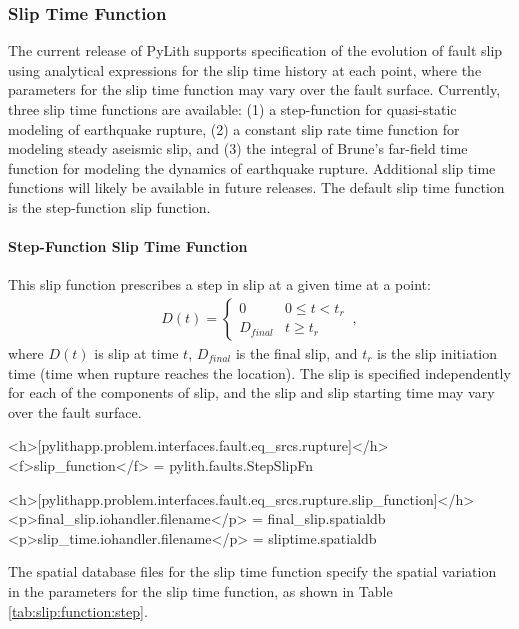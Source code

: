 \subsubsection{Slip Time Function}

The current release of PyLith supports specification of the evolution
of fault slip using analytical expressions for the slip time history
at each point, where the parameters for the slip time function may
vary over the fault surface. Currently, three slip time functions
are available: (1) a step-function for quasi-static modeling of earthquake
rupture, (2) a constant slip rate time function for modeling steady
aseismic slip, and (3) the integral of Brune's far-field time function
\cite{Brune:1970} for modeling the dynamics of earthquake rupture.
Additional slip time functions will likely be available in future
releases. The default slip time function is the step-function slip
function.


\paragraph{Step-Function Slip Time Function}

This slip function prescribes a step in slip at a given time at a
point: 
\begin{gather}
D(t)=\left\{ \begin{array}{cc}
0 & 0\leq t<t_{r}\\
D_{final} & t\ge t_{r}
\end{array}\right.\,,
\end{gather}
where $D(t)$ is slip at time $t$, $D_{final}$ is the final slip,
and $t_{r}$ is the slip initiation time (time when rupture reaches
the location). The slip is specified independently for each of the
components of slip, and the slip and slip starting time may vary over
the fault surface.
\begin{inventory}
\end{inventory}

\begin{cfg}
<h>[pylithapp.problem.interfaces.fault.eq_srcs.rupture]</h>
<f>slip_function</f> = pylith.faults.StepSlipFn 

<h>[pylithapp.problem.interfaces.fault.eq_srcs.rupture.slip_function]</h>
<p>final_slip.iohandler.filename</p> = final_slip.spatialdb
<p>slip_time.iohandler.filename</p> = sliptime.spatialdb
\end{cfg}
The spatial database files for the slip time function specify the
spatial variation in the parameters for the slip time function, as
shown in Table \vref{tab:slip:function:step}.

